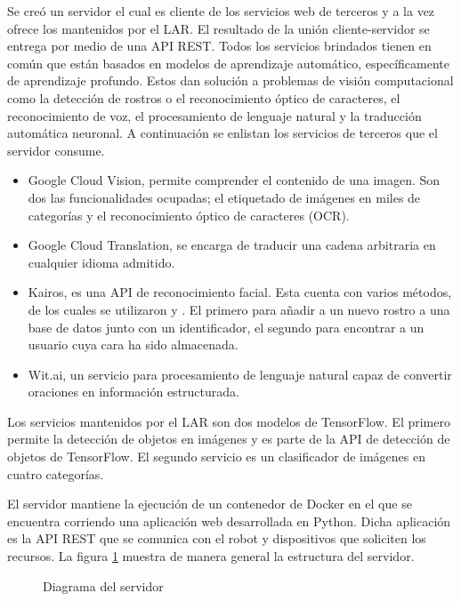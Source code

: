 Se creó un servidor el cual es cliente de los servicios web de terceros y a la vez
ofrece los mantenidos por el LAR.
El resultado de la unión cliente-servidor se
entrega por medio de una
API REST.
Todos los servicios brindados tienen en común que están basados en modelos de
aprendizaje automático, específicamente de aprendizaje profundo. Estos dan solución
a problemas de visión computacional como la detección de rostros o el
reconocimiento óptico de caracteres, el reconocimiento
de voz, el procesamiento de lenguaje natural y la traducción automática
neuronal. A continuación se enlistan los servicios de terceros que el servidor
consume.
\begin{itemize}
\item {} 
Google Cloud Vision, permite comprender el contenido de una imagen. Son dos las funcionalidades ocupadas; el etiquetado de imágenes en miles de categorías y el reconocimiento óptico de caracteres (OCR).


\item {} 
Google Cloud Translation, se encarga de traducir una cadena arbitraria en cualquier idioma admitido.

\item {} 
Kairos, es una API de reconocimiento facial. Esta cuenta con varios métodos, de los cuales se utilizaron  y . El primero para añadir a un nuevo rostro a una base de datos junto con un identificador, el segundo para encontrar a un usuario cuya cara ha sido almacenada.

\item {} 
Wit.ai, un servicio para procesamiento de lenguaje natural capaz de convertir oraciones en información estructurada.

\end{itemize}


Los servicios mantenidos por el LAR son dos modelos de TensorFlow.
El primero permite la detección de objetos en imágenes y es parte
de la API de detección de objetos de TensorFlow. El segundo
servicio es un clasificador de imágenes en cuatro categorías.

El servidor mantiene la ejecución de un contenedor de
Docker en el que se encuentra corriendo una aplicación web desarrollada en Python.
Dicha aplicación es la API REST que se comunica con el robot y dispositivos
que soliciten los recursos. 
La figura \ref{\detokenize{chapter_two/desc_cloudnao:cn-server-lar-diagram}} muestra de manera general la estructura del
servidor.

\begin{figure}[htbp]
\centering


\noindent{}
\caption{Diagrama del servidor}\label{\detokenize{chapter_two/desc_cloudnao:cn-server-lar-diagram}}\end{figure}
